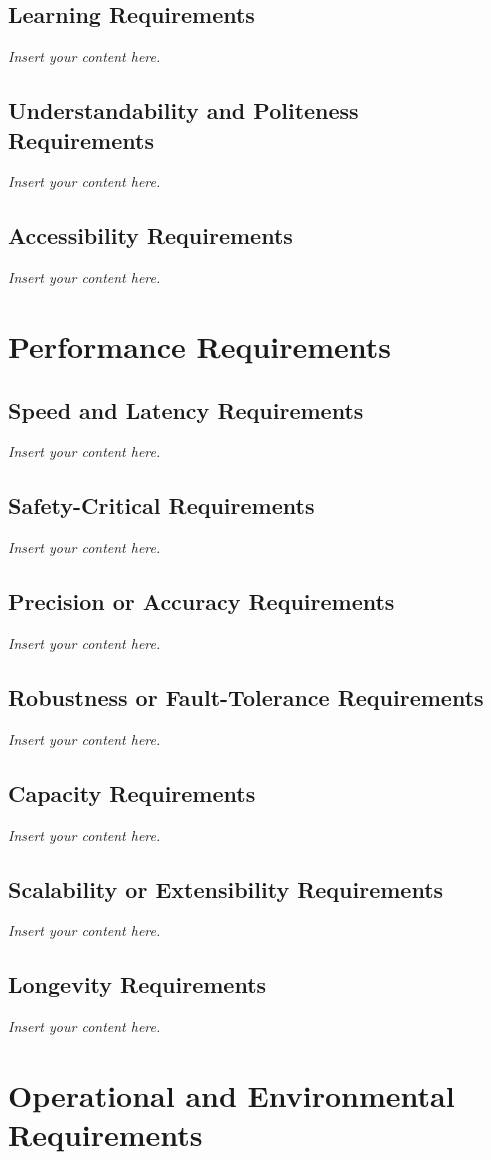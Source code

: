 \documentclass[12pt]{article}
\newcommand{\lips}{\textit{Insert your content here.}}
\begin{document}
\subsection{Learning Requirements}
\lips
\subsection{Understandability and Politeness Requirements}
\lips
\subsection{Accessibility Requirements}
\lips

\section{Performance Requirements}
\subsection{Speed and Latency Requirements}
\lips
\subsection{Safety-Critical Requirements}
\lips
\subsection{Precision or Accuracy Requirements}
\lips
\subsection{Robustness or Fault-Tolerance Requirements}
\lips
\subsection{Capacity Requirements}
\lips
\subsection{Scalability or Extensibility Requirements}
\lips
\subsection{Longevity Requirements}
\lips

\section{Operational and Environmental Requirements}
\end{document}
